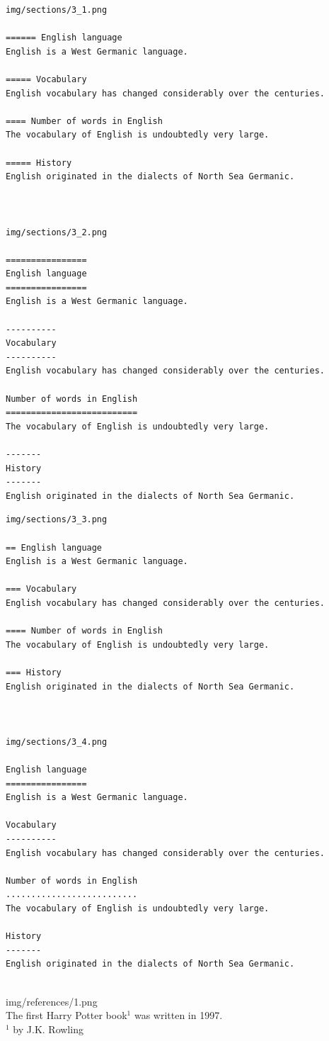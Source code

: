 \documentclass[14pt]{article}
\begin{document}
\newpage
\begin{verbatim}
img/sections/3_1.png

====== English language
English is a West Germanic language.

===== Vocabulary
English vocabulary has changed considerably over the centuries.

==== Number of words in English
The vocabulary of English is undoubtedly very large.

===== History
English originated in the dialects of North Sea Germanic.



img/sections/3_2.png

================
English language
================
English is a West Germanic language.

----------
Vocabulary
----------
English vocabulary has changed considerably over the centuries.

Number of words in English
==========================
The vocabulary of English is undoubtedly very large.

-------
History
-------
English originated in the dialects of North Sea Germanic.

\end{verbatim}
\newpage
\begin{verbatim}
img/sections/3_3.png

== English language
English is a West Germanic language.

=== Vocabulary
English vocabulary has changed considerably over the centuries.

==== Number of words in English
The vocabulary of English is undoubtedly very large.

=== History
English originated in the dialects of North Sea Germanic.



img/sections/3_4.png

English language
================
English is a West Germanic language.

Vocabulary
----------
English vocabulary has changed considerably over the centuries.

Number of words in English
..........................
The vocabulary of English is undoubtedly very large.

History
-------
English originated in the dialects of North Sea Germanic.


\end{verbatim}
\noindent
img/references/1.png\\[.5cm]
The first Harry Potter book$^1$ was written in 1997.\\[1cm]
$^1$ by J.K. Rowling
\end{document}
